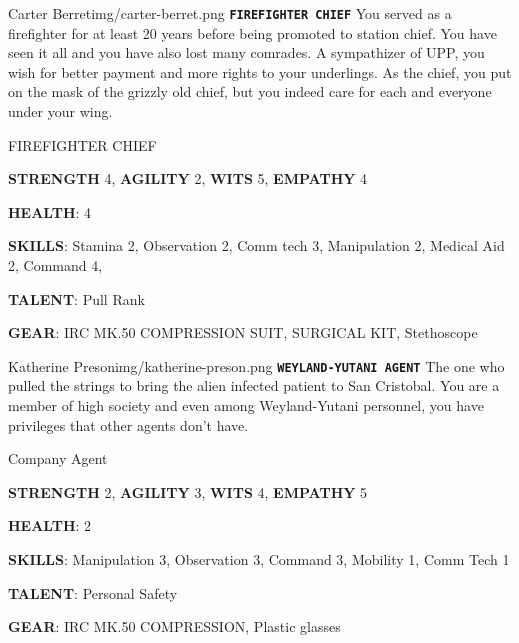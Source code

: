 

\begin{rpg-pcbox}{Carter Berret}{img/carter-berret.png}
    \texttt{\textbf{FIREFIGHTER CHIEF}} You served as a firefighter for at least 20 years before being promoted to station chief. You have seen it all and you have also lost many comrades. A sympathizer of UPP, you wish for better payment and more rights to your underlings. As the chief, you put on the mask of the grizzly old chief, but you indeed care for each and everyone under your wing.
\end{rpg-pcbox}

\begin{rpg-commentbox}{}
    FIREFIGHTER CHIEF

    \textbf{STRENGTH} 4, \textbf{AGILITY} 2, \textbf{WITS} 5, \textbf{EMPATHY} 4

    \textbf{HEALTH}: 4

    \textbf{SKILLS}: Stamina 2, Observation 2, Comm tech 3, Manipulation 2, Medical Aid 2, Command 4,
    
    \textbf{TALENT}: Pull Rank
    
    \textbf{GEAR}: IRC MK.50 COMPRESSION SUIT, SURGICAL KIT, Stethoscope

\end{rpg-commentbox}


\newsect

\begin{rpg-pcbox}{Katherine Preson}{img/katherine-preson.png}
    \texttt{\textbf{WEYLAND-YUTANI AGENT}} The one who pulled the strings to bring the alien infected patient to San Cristobal. You are a member of high society and even among Weyland-Yutani personnel, you have privileges that other agents don't have.  
\end{rpg-pcbox}

\begin{rpg-commentbox}{}
    Company Agent

    \textbf{STRENGTH} 2, \textbf{AGILITY} 3, \textbf{WITS} 4, \textbf{EMPATHY} 5

    \textbf{HEALTH}: 2

    \textbf{SKILLS}: Manipulation 3, Observation 3, Command 3, Mobility 1, Comm Tech 1
    
    \textbf{TALENT}: Personal Safety
    
    \textbf{GEAR}: IRC MK.50 COMPRESSION, Plastic glasses
  
\end{rpg-commentbox}


